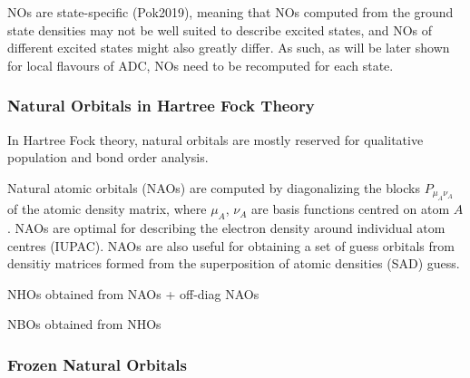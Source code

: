 NOs are state-specific (Pok2019), meaning that NOs computed from the ground state densities may not be well suited to describe excited states, and NOs of different excited states might also greatly differ. As such, as will be later shown for local flavours of ADC, NOs need to be recomputed for each state.


\subsubsection*{Natural Orbitals in Hartree Fock Theory}

In Hartree Fock theory, natural orbitals are mostly reserved for qualitative population and bond order analysis. 

Natural atomic orbitals (NAOs) are computed by diagonalizing the blocks $P_{\mu_A\nu_A}$ of the atomic density matrix, where ${\mu_A}$, ${\nu_A}$ are basis functions centred on atom $A$. NAOs are optimal for describing the electron density around individual atom centres (IUPAC). NAOs are also useful for obtaining a set of guess orbitals from densitiy matrices formed from the superposition of atomic densities (SAD) guess. 

NHOs obtained from NAOs + off-diag NAOs 

NBOs obtained from NHOs





\subsubsection*{Frozen Natural Orbitals}

